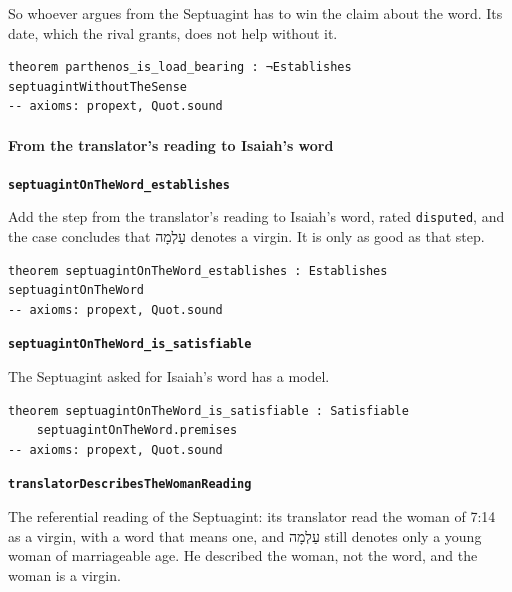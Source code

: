\documentclass[11pt]{article}
\begin{document}
So whoever argues from the Septuagint has to win the claim about the word. Its date, which the rival grants, does not help without it.

{\small\begin{verbatim}
theorem parthenos_is_load_bearing : ¬Establishes septuagintWithoutTheSense
-- axioms: propext, Quot.sound
\end{verbatim}}
\paragraph*{From the translator’s reading to Isaiah’s word}
\leavevmode\par\nobreak
\par\medskip\noindent\textbf{\texttt{septuagint\allowbreak{}On\allowbreak{}The\allowbreak{}Word\_\allowbreak{}establishes}}\par\nobreak\noindent
Add the step from the translator’s reading to Isaiah’s word, rated \texttt{disputed}, and the case concludes that עַלְמָה denotes a virgin. It is only as good as that step.

{\small\begin{verbatim}
theorem septuagintOnTheWord_establishes : Establishes septuagintOnTheWord
-- axioms: propext, Quot.sound
\end{verbatim}}
\par\medskip\noindent\textbf{\texttt{septuagint\allowbreak{}On\allowbreak{}The\allowbreak{}Word\_\allowbreak{}is\_\allowbreak{}satisfiable}}\par\nobreak\noindent
The Septuagint asked for Isaiah’s word has a model.

{\small\begin{verbatim}
theorem septuagintOnTheWord_is_satisfiable : Satisfiable
    septuagintOnTheWord.premises
-- axioms: propext, Quot.sound
\end{verbatim}}
\par\medskip\noindent\textbf{\texttt{translator\allowbreak{}Describes\allowbreak{}The\allowbreak{}Woman\allowbreak{}Reading}}\par\nobreak\noindent
The referential reading of the Septuagint: its translator read the woman of 7:14 as a virgin, with a word that means one, and עַלְמָה still denotes only a young woman of marriageable age. He described the woman, not the word, and the woman is a virgin.
\end{document}
